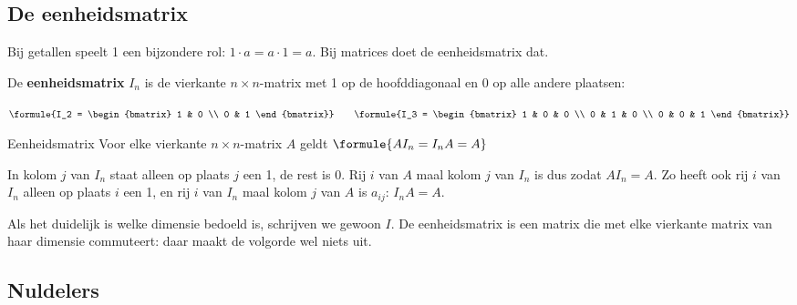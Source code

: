 \begin{oefeningen}
\end{oefeningen}

\subsection{De eenheidsmatrix}

Bij getallen speelt 1 een bijzondere rol: $1 \cdot a = a \cdot 1 = a$. Bij matrices doet de eenheidsmatrix dat.

\begin{theorie}
De \textbf{\textcolor{accent}{eenheidsmatrix}} $I_n$ is de vierkante $n \times n$-matrix met 1 op de hoofddiagonaal en 0 op alle andere plaatsen:

\vspace{1mm}
\qquad $\formule{I_2 = \begin{bmatrix} 1 & 0 \\ 0 & 1 \end{bmatrix}} \qquad \formule{I_3 = \begin{bmatrix} 1 & 0 & 0 \\ 0 & 1 & 0 \\ 0 & 0 & 1 \end{bmatrix}}$

\begin{stelling}{Eenheidsmatrix}
Voor elke vierkante $n \times n$-matrix $A$ geldt \quad $\formule{A I_n = I_n A = A}$
\end{stelling}

\begin{bewijs}
In kolom $j$ van $I_n$ staat alleen op plaats $j$ een 1, de rest is 0. Rij $i$ van $A$ maal kolom $j$ van $I_n$ is dus
zodat $AI_n = A$. Zo heeft ook rij $i$ van $I_n$ alleen op plaats $i$ een 1, en rij $i$ van $I_n$ maal kolom $j$ van $A$ is $a_{ij}$: $I_n A = A$.
\end{bewijs}
\end{theorie}

Als het duidelijk is welke dimensie bedoeld is, schrijven we gewoon $I$. De eenheidsmatrix is een matrix die met elke vierkante matrix van haar dimensie commuteert: daar maakt de volgorde wel niets uit.

\subsection{Nuldelers}

